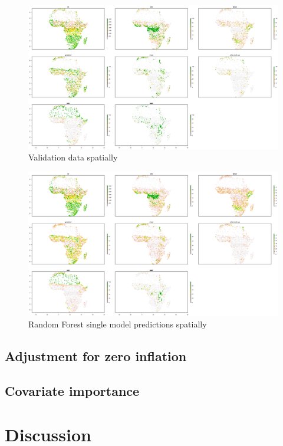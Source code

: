 \documentclass[a4paper,10pt]{article}
\begin{document}
\begin{figure}
    \includegraphics[width=\textwidth]{article-figures/maps/2019-04-10-rasterised-validation}
    \caption{Validation data spatially}
    \label{raster-validation}
\end{figure}
\begin{figure}
    \includegraphics[width=\textwidth]{article-figures/maps/2019-04-10-rasterised-rf-1m-uncor}
    \caption{Random Forest single model predictions spatially}
    \label{raster-rf-1m-uncor}
\end{figure}

\subsection{Adjustment for zero inflation}

\subsection{Covariate importance}

\section{Discussion}
\end{document}
